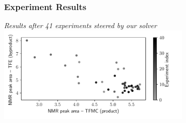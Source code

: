 \documentclass[aspectratio=169]{beamer}
\begin{document}
\begin{frame}
\frametitle{Experiment Results}
  \begin{center}
  {\sl Results after 41 experiments steered by our solver}\\
  \includegraphics[width=0.7\textwidth]{../../img/moo_new/tfmc-tradeoff-eps-converted-to.pdf}\\
  \end{center}
\end{frame}
\end{document}
